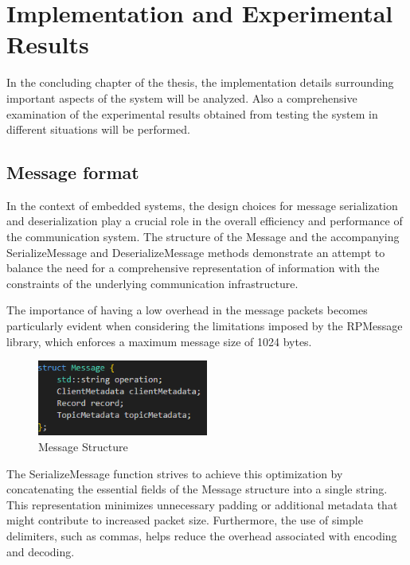 

\chapter[Implementation and Resulsts]{Implementation and Experimental Results}

In the concluding chapter of the thesis, the implementation details surrounding
important aspects of the system will be analyzed.
Also a comprehensive examination of the experimental results obtained from testing
the system in different situations will be performed.

\section{Message format}

In the context of embedded systems, the design choices for message
serialization and deserialization play a crucial role in the
overall efficiency and performance of the communication system.
The structure of the Message and the accompanying SerializeMessage and
DeserializeMessage methods demonstrate an attempt to balance the need for a
comprehensive representation of information with the constraints of the
underlying communication infrastructure.

The importance of having a low overhead in the message packets becomes
particularly evident when considering the limitations imposed by the RPMessage
library, which enforces a maximum message size of 1024 bytes.

\begin{figure}[H]
    \centering
    \includegraphics[width=0.5\textwidth]{Figures/implementation_message_format.png}
    \caption{Message Structure}
\end{figure}

The SerializeMessage function strives to achieve this optimization by
concatenating the essential fields of the Message structure into a single
string. This representation minimizes unnecessary padding or additional
metadata that might contribute to increased packet size.
Furthermore, the use of simple delimiters, such as commas, helps reduce the
overhead associated with encoding and decoding.

